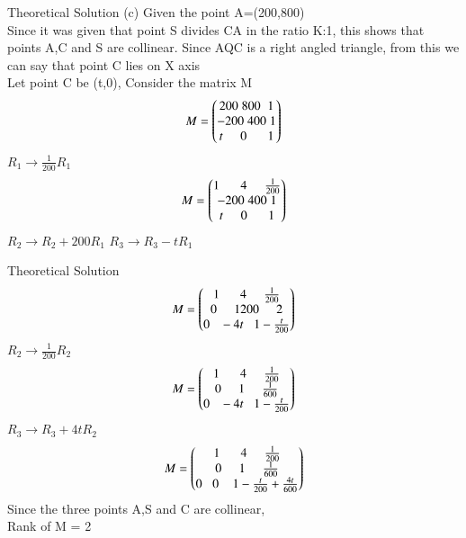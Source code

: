 \documentclass{beamer}
\begin{document}
    \begin{frame}{Theoretical Solution}
        (c) Given the point A=(200,800)\\
            Since it was given that point S divides CA in the ratio K:1, this shows that points A,C and S are collinear. Since AQC is a right angled triangle, from this we can say that point C lies on X axis\\
            Let point C be (t,0), Consider the matrix M\\
            \begin{align}
                M = \begin{pmatrix}200\;800\;\;1\\-200\;400\;1\\t\;\;\;\;\;0\;\;\;\;\;\;1\end{pmatrix}
            \end{align}
            {\large$R_1\rightarrow{}\frac{1}{200}R_1$}
            \begin{align}
                 M = \begin{pmatrix}1\;\;\;\;\;\;4\;\;\;\;\;\frac{1}{200}\\-200\;400\;1\\t\;\;\;\;\;0\;\;\;\;\;\;1\end{pmatrix}
            \end{align}
            {\large$R_2\rightarrow{}R_2 + 200R_1$}\hspace{2cm}
            {\large$R_3\rightarrow{R_3 - tR_1}$}
    \end{frame}
    \begin{frame}{Theoretical Solution}
        \begin{align}
                 M = \begin{pmatrix}1\;\;\;\;\;\;4\;\;\;\;\;\frac{1}{200}\\0\;\;\;\;\;1200\;\;\;\;\;2\\0\;\;\;-4t\;\;\;1-\frac{t}{200}\end{pmatrix}
            \end{align}
            {\large$R_2\rightarrow{\frac{1}{200}R_2}$}
            \begin{align}
                M = \begin{pmatrix}1\;\;\;\;\;\;4\;\;\;\;\;\frac{1}{200}\\0\;\;\;\;\;1\;\;\;\;\;\frac{1}{600}\\0\;\;\;-4t\;\;\;1-\frac{t}{200}\end{pmatrix}
            \end{align}
            {\large$R_3\rightarrow{R_3 + 4tR_2}$}
            \begin{align}
                M = \begin{pmatrix}1\;\;\;\;\;\;4\;\;\;\;\;\frac{1}{200}\\0\;\;\;\;\;1\;\;\;\;\;\frac{1}{600}\\0\;\;\;0\;\;\;\;1-\frac{t}{200}+\frac{4t}{600}\end{pmatrix}
            \end{align}
            Since the three points A,S and C are collinear,\\
            Rank of M = 2
    \end{frame}
\end{document}
